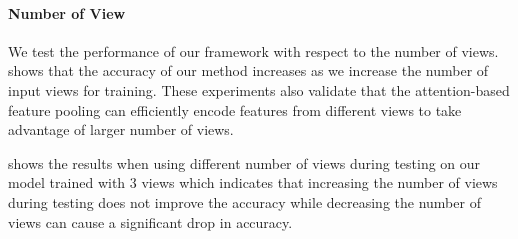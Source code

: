 



% 


% 
\vspace{-4mm}
\paragraph{Number of View}
We test the performance of our framework with respect to the number of views.
 shows that the accuracy of our method increases as we increase the number of input views for training.
These experiments also validate that the attention-based feature pooling can efficiently encode features from different views to take advantage of larger number of views.

 shows the results when using different number of views during testing on our model trained with 3 views
which indicates that increasing the number of views during testing does not improve the accuracy while decreasing the number of views can cause a significant drop in accuracy.

